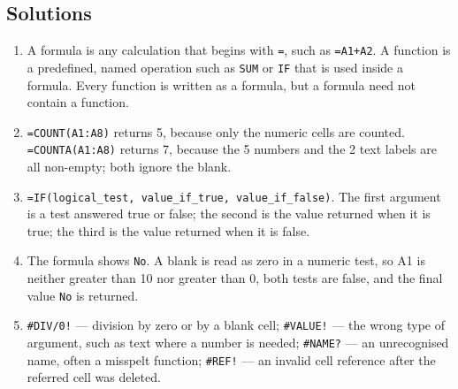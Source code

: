 \documentclass[11pt]{article}
\begin{document}
\subsection*{Solutions}
\begingroup\small
\begin{enumerate}[label=\arabic*.]
  \item A formula is any calculation that begins with \texttt{=}, such as
    \texttt{=A1+A2}. A function is a predefined, named operation such as
    \texttt{SUM} or \texttt{IF} that is used inside a formula. Every function
    is written as a formula, but a formula need not contain a function.
  \item \texttt{=COUNT(A1:A8)} returns 5, because only the numeric cells are
    counted. \texttt{=COUNTA(A1:A8)} returns 7, because the 5 numbers and the
    2 text labels are all non-empty; both ignore the blank.
  \item \texttt{=IF(logical\_test, value\_if\_true, value\_if\_false)}. The
    first argument is a test answered true or false; the second is the value
    returned when it is true; the third is the value returned when it is
    false.
  \item The formula shows \texttt{No}. A blank is read as zero in a numeric
    test, so A1 is neither greater than 10 nor greater than 0, both tests are
    false, and the final value \texttt{No} is returned.
  \item \texttt{\#DIV/0!} --- division by zero or by a blank cell;
    \texttt{\#VALUE!} --- the wrong type of argument, such as text where a
    number is needed; \texttt{\#NAME?} --- an unrecognised name, often a
    misspelt function; \texttt{\#REF!} --- an invalid cell reference after
    the referred cell was deleted.
\end{enumerate}
\endgroup
\end{document}
